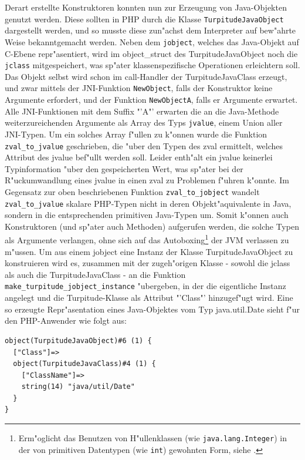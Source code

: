 Derart erstellte Konstruktoren konnten nun zur Erzeugung von Java-Objekten genutzt werden. Diese sollten in PHP durch die Klasse
\texttt{TurpitudeJavaObject} dargestellt werden, und so musste diese zun"achst dem Interpreter auf bew"ahrte Weise bekanntgemacht werden.
Neben dem \texttt{jobject}, welches das Java-Objekt auf C-Ebene repr"asentiert, wird im object\_struct des TurpitudeJavaObject noch die \texttt{jclass}
mitgespeichert, was sp"ater klassenspezifische Operationen erleichtern soll. Das Objekt selbst wird schon im call-Handler der TurpitudeJavaClass 
erzeugt, und zwar mittels der JNI-Funktion \texttt{NewObject}, falls der Konstruktor keine Argumente erfordert, und der Funktion \texttt{NewObjectA}, falls
er Argumente erwartet. Alle JNI-Funktionen mit dem Suffix "'A"' erwarten die an die Java-Methode weiterzureichenden Argumente als Array
des Typs \texttt{jvalue}, einem Union aller JNI-Typen. Um ein solches Array f"ullen zu k"onnen wurde die Funktion \texttt{zval\_to\_jvalue} geschrieben,
die "uber den Typen des zval ermittelt, welches Attribut des jvalue bef"ullt werden soll. Leider enth"alt ein jvalue keinerlei Typinformation "uber den
gespeicherten Wert, was sp"ater bei der R"uckumwandlung eines jvalue in einen zval zu Problemen f"uhren k"onnte. Im Gegensatz zur oben beschriebenen 
Funktion \texttt{zval\_to\_jobject} wandelt \texttt{zval\_to\_jvalue} skalare PHP-Typen nicht in deren Objekt"aquivalente in Java, sondern in die
entsprechenden primitiven Java-Typen um. Somit k"onnen auch Konstruktoren (und sp"ater auch Methoden) aufgerufen werden, die solche Typen als Argumente
verlangen, ohne sich auf das Autoboxing\footnote{
Erm"oglicht das Benutzen von H"ullenklassen (wie \texttt{java.lang.Integer}) in der von primitiven Datentypen (wie \texttt{int}) gewohnten Form,
siehe \cite{AUTOBOXING}.
} der JVM verlassen zu m"ussen.
Um aus einem jobject eine Instanz der Klasse
TurpitudeJavaObject zu konstruieren wird es, zusammen mit der zugeh"origen Klasse - sowohl die jclass als auch die TurpitudeJavaClass - an die Funktion 
\texttt{make\_turpitude\_jobject\_instance} "ubergeben, in der die eigentliche Instanz angelegt und die Turpitude-Klasse als Attribut "'Class"' hinzugef"ugt wird. 
Eine so erzeugte Repr"asentation eines Java-Objektes vom Typ java.util.Date sieht f"ur den PHP-Anwender wie folgt aus:

\begin{lstlisting}[caption=Dump eines TurpitudeJavaObject]
object(TurpitudeJavaObject)#6 (1) {
  ["Class"]=>
  object(TurpitudeJavaClass)#4 (1) {
    ["ClassName"]=>
    string(14) "java/util/Date"
  }
}
\end{lstlisting}

